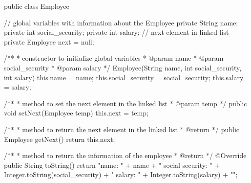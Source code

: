 \documentclass{article}
\begin{document}
\newpage
\begin{spverbatim}
public class Employee {
	
    // global variables with information about the Employee
    private String name;
    private int social_security;
    private int salary;
    // next element in linked list
    private Employee next = null;
	
    /**
    * constructor to initialize global variables
    * @param name
    * @param social_security
    * @param salary 
    */
    Employee(String name, int social_security, int salary){
        this.name = name;
        this.social_security = social_security;
        this.salary = salary;
    }
	
    /**
    * method to set the next element in the linked list
    * @param temp 
    */
    public void setNext(Employee temp){ this.next = temp; }

    /**
    * method to return the next element in the linked list
    * @return 
    */
    public Employee getNext(){ return this.next; }
	
    /**
    * method to return the information of the employee
    * @return 
    */
    @Override
    public String toString(){ 
        return "name: " + name + " social security: " + Integer.toString(social_security)
        + " salary: " + Integer.toString(salary) + "\n";
    }
}
\end{spverbatim}
\end{document}
